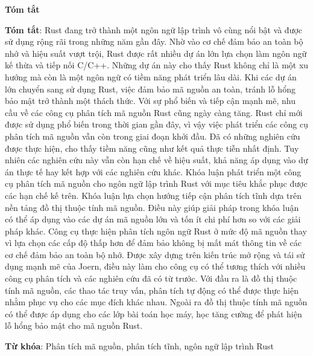 \begin{center}
\textbf{\large{Tóm tắt}}
\end{center}


\begin{small}
\textbf{Tóm tắt}: Rust đang trở thành một ngôn ngữ lập trình vô cùng nổi bật và được sử dụng rộng rãi trong những năm gần đây.
Nhờ vào cơ chế đảm bảo an toàn bộ nhớ và hiệu suất vượt trội, Rust được rất nhiều dự án lớn lựa chọn làm ngôn ngữ kế thừa và tiếp nối C/C++.
Những dự án này cho thấy Rust không chỉ là một xu hướng mà còn là một ngôn ngữ có tiềm năng phát triển lâu dài.
Khi các dự án lớn chuyển sang sử dụng Rust, việc đảm bảo mã nguồn an toàn, tránh lỗ hổng bảo mật trở thành một thách thức.
Với sự phổ biến và tiếp cận mạnh mẽ, nhu cầu về các công cụ phân tích mã nguồn Rust cũng ngày càng tăng.
Rust chỉ mới được sử dụng phổ biến trong thời gian gần đây, vì vậy việc phát triển các công cụ phân tích mã nguồn vẫn còn trong giai đoạn khởi đầu.
Đã có những nghiên cứu được thực hiện, cho thấy tiềm năng cũng như kết quả thực tiễn nhất định.
Tuy nhiên các nghiên cứu này vẫn còn hạn chế về hiệu suất, khả năng áp dụng vào dự án thực tế hay kết hợp với các nghiên cứu khác.
Khóa luận phát triển một công cụ phân tích mã nguồn cho ngôn ngữ lập trình Rust với mục tiêu khắc phục được các hạn chế kế trên.
Khóa luận lựa chọn hướng tiếp cận phân tích tĩnh dựa trên nền tảng đồ thị thuộc tính mã nguồn.
Điều này giúp giải pháp trong khóa luận có thể áp dụng vào các dự án mã nguồn lớn và tốn ít chi phí hơn so với các giải pháp khác.
Công cụ thực hiện phân tích ngôn ngữ Rust ở mức độ mã nguồn thay vì lựa chọn các cấp độ thấp hơn để đảm bảo không bị mất mát thông tin về các cơ chế đảm bảo an toàn bộ nhớ.
Được xây dựng trên kiến trúc mở rộng và tái sử dụng mạnh mẽ của Joern, điều này làm cho công cụ có thể tương thích với nhiều công cụ phân tích và các nghiên cứu đã có từ trước.
Với đầu ra là đồ thị thuộc tính mã nguồn, các thao tác truy vấn, phân tích tự động có thể được thực hiện nhằm phục vụ cho các mục đích khác nhau.
Ngoài ra đồ thị thuộc tính mã nguồn có thể được áp dụng cho các lớp bài toán học máy, học tăng cường để phát hiện lỗ hổng bảo mật cho mã nguồn Rust.

\vspace*{1cm}
\textbf{Từ khóa}: Phân tích mã nguồn, phân tích tĩnh, ngôn ngữ lập trình Rust

\end{small}